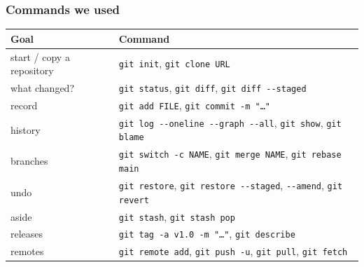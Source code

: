 \documentclass[aspectratio=169,10pt,compress]{beamer}
\begin{document}




\begin{frame}[t,fragile] \frametitle{Commands we used}
  \begin{center}\footnotesize
  \begin{tabular}{ll}
    \toprule
    \textbf{Goal} & \textbf{Command} \\
    \midrule
    start / copy a repository      & \texttt{git init}, \texttt{git clone URL} \\
    what changed?                  & \texttt{git status}, \texttt{git diff}, \texttt{git diff -{}-staged} \\
    record                         & \texttt{git add FILE}, \texttt{git commit -m "\dots"} \\
    history                        & \texttt{git log -{}-oneline -{}-graph -{}-all}, \texttt{git show}, \texttt{git blame} \\
    branches                       & \texttt{git switch -c NAME}, \texttt{git merge NAME}, \texttt{git rebase main} \\
    undo                           & \texttt{git restore}, \texttt{git restore -{}-staged}, \texttt{-{}-amend}, \texttt{git revert} \\
    aside                          & \texttt{git stash}, \texttt{git stash pop} \\
    releases                       & \texttt{git tag -a v1.0 -m "\dots"}, \texttt{git describe} \\
    remotes                        & \texttt{git remote add}, \texttt{git push -u}, \texttt{git pull}, \texttt{git fetch} \\
    \bottomrule
  \end{tabular}
  \end{center}
\end{frame}
\end{document}
